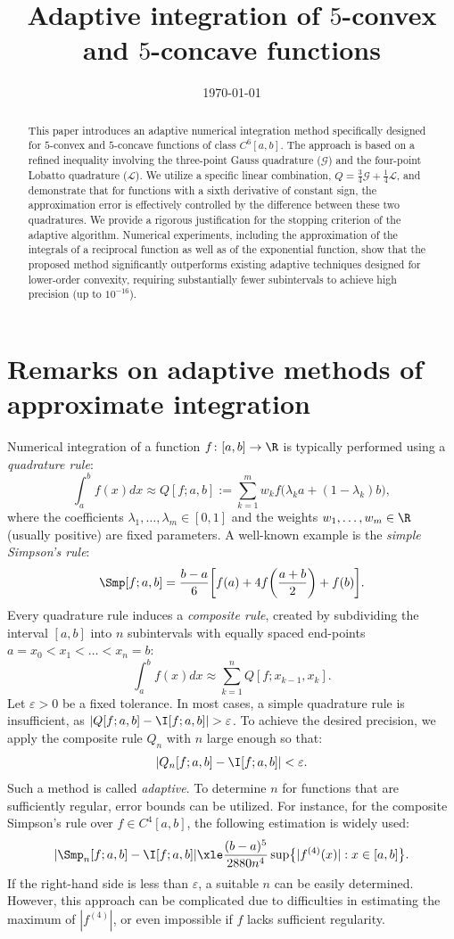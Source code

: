 \documentclass[12pt]{amsart}
\author{\SW}
\title{Adaptive integration of $5$-convex and $5$-concave functions}
\date{\today}
\theoremstyle{definition}
\begin{document}
\begin{abstract}
This paper introduces an adaptive numerical integration method specifically designed for $5$-convex and $5$-concave functions of class $C^6[a,b]$. The approach is based on a refined inequality involving the three-point Gauss quadrature ($\mathcal{G}$) and the four-point Lobatto quadrature ($\mathcal{L}$). We utilize a specific linear combination, $Q = \frac{3}{4}\mathcal{G} + \frac{1}{4}\mathcal{L}$, and demonstrate that for functions with a sixth derivative of constant sign, the approximation error is effectively controlled by the difference between these two quadratures. We provide a rigorous justification for the stopping criterion of the adaptive algorithm. Numerical experiments, including the approximation of the integrals of a reciprocal function as well as of the exponential function, show that the proposed method significantly outperforms existing adaptive techniques designed for lower-order convexity, requiring substantially fewer subintervals to achieve high precision (up to $10^{-16}$).
\end{abstract}

\maketitle

\section{Remarks on adaptive methods of approximate integration}
Numerical integration of a function $f\colon [a,b]\to\R$ is typically performed using a \emph{quadrature rule}:
\[
\int_a^b f(x) dx \approx Q[f;a,b] := \sum_{k=1}^m w_k f\bigl(\lambda_k a + (1-\lambda_k)b\bigr),
\]
where the coefficients $\lambda_1, \dots, \lambda_m \in [0,1]$ and the weights $w_1, \dots, w_m \in \R$ (usually positive) are fixed parameters. A well-known example is the \emph{simple Simpson's rule}:
\[
\Smp[f;a,b] = \frac{b-a}{6} \biggl[f(a) + 4f\biggl(\frac{a+b}{2}\biggr) + f(b)\biggr].
\]
Every quadrature rule induces a \emph{composite rule}, created by subdividing the interval $[a,b]$ into $n$ subintervals with equally spaced end-points $a=x_0 < x_1 < \dots < x_n=b$:
\[
\int_a^b f(x) dx \approx \sum_{k=1}^n Q[f;x_{k-1}, x_k].
\]
Let $\varepsilon > 0$ be a fixed tolerance. In most cases, a simple quadrature rule is insufficient, as $|Q[f;a,b] - \I[f;a,b]| > \varepsilon$. To achieve the desired precision, we apply the composite rule $Q_n$ with $n$ large enough so that:
\[
|Q_n[f;a,b] - \I[f;a,b]| < \varepsilon.
\]
Such a method is called \emph{adaptive}. To determine $n$ for functions that are sufficiently regular, error bounds can be utilized. For instance, for the composite Simpson's rule over $f \in C^4[a,b]$, the following estimation is widely used:
\[
|\Smp_n[f;a,b] - \I[f;a,b]| \xle \frac{(b-a)^5}{2880n^4} \sup \bigl\{ |f^{(4)}(x)| : x \in [a,b] \bigr\}.
\]
If the right-hand side is less than $\varepsilon$, a suitable $n$ can be easily determined. However, this approach can be complicated due to difficulties in estimating the maximum of $|f^{(4)}|$, or even impossible if $f$ lacks sufficient regularity.
\end{document}
